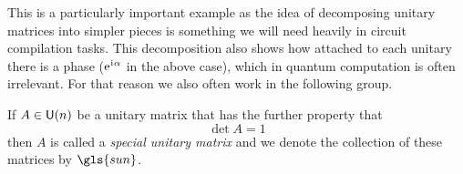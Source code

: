 This is a particularly important example as the idea of decomposing unitary matrices into simpler pieces is something we will need heavily in circuit compilation tasks.
This decomposition also shows how attached to each unitary there is a phase ($\mathrm{e}^{\mkern1mu\mathrm{i}\mkern1mu\alpha}$ in the above case), which in quantum computation is often irrelevant.
For that reason we also often work in the following group.
\begin{definition}
    If $A \in \mathsf{U} (n)$ be a unitary matrix that has the further property that
    \begin{equation}
        \det A = 1
    \end{equation}
    then $A$ is called a \emph{special unitary matrix} and we denote the collection of these matrices by $\gls{sun}$.
\end{definition}


